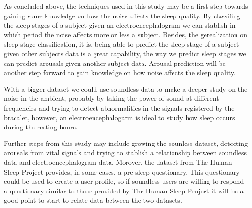As concluded above, the techniques used in this study may be a first step towards gaining some knowledge on how the noise affects the sleep quality. By classifing the sleep stages of a subject given an electroencephalogram we can stablish in which period the noise affects more or less a subject. Besides, the gerealization on sleep stage classification, it is, being able to predict the sleep stage of a subject given other subjects data is a great capability, the way we predict sleep stages we can predict arousals given another subject data. Arousal prediction will be another step forward to gain knowledge on how noise affects the sleep quality. 

With a bigger dataset we could use soundless data to make a deeper study on the noise in the ambient, probably by taking the power of sound at different frequencies and trying to detect abnormalities in the signals registered by the bracalet, however, an electroencephalogarm is ideal to study how sleep occurs during the resting hours. 

Further steps from this study may include growing the sounless dataset, detecting arousals from vital signals and trying to stablish a relationship between soundless data and electroencephalogram data. Morover, the dataset from The Human Sleep Project provides, in some cases, a pre-sleep questionary. This questionary could be used to create a user profile, so if soundless users are willing to respond a questionary similar to those provided by The Human Sleep Project it will be a good point to start to relate data between the two datasets.  

\blindtext



